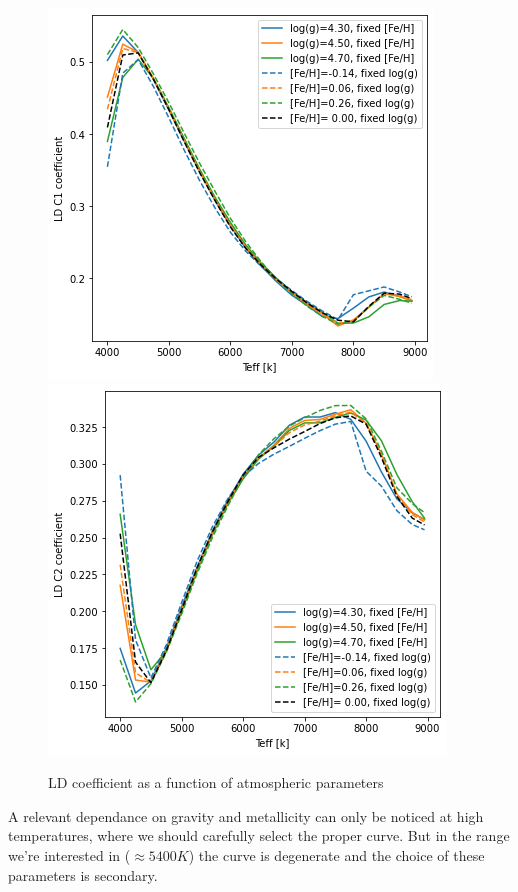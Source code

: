 \documentclass[a4paper,11pt,twocolumn]{article}
\begin{document}
\begin{figure}[H]
    \centering  
    \includegraphics[scale=0.25, angle=0]{../pictures/Claret2017/2017_c1}
    \includegraphics[scale=0.25, angle=0]{../pictures/Claret2017/2017_c2}
    \caption{LD coefficient as a function of atmospheric parameters}
\end{figure}
A relevant dependance on gravity and metallicity can only be noticed at 
high temperatures, where we should carefully select the proper curve. But 
in the range we're interested in ($\approx 5400 K$) the curve is 
degenerate and the choice of these parameters is secondary.
\end{document}
